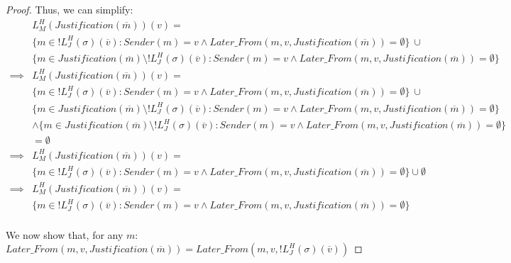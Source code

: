 \begin{proof}
Thus, we can simplify:
\begin{align}
          &L^H_M(Justification(\overline{m}))(v) = \\
          &\{m \in !L^H_J(\sigma)(\overline{v}) : Sender(m) = v \land Later\_From(m,v,Justification(\overline{m})) = \emptyset\} ~\cup \\
          &\{m \in Justification(\overline{m}) \setminus !L^H_J(\sigma)(\overline{v}) : Sender(m) = v \land Later\_From(m,v,Justification(\overline{m})) = \emptyset\}\\
  \implies&L^H_M(Justification(\overline{m}))(v) = \\
          &\{m \in !L^H_J(\sigma)(\overline{v}) : Sender(m) = v \land Later\_From(m,v,Justification(\overline{m})) = \emptyset\} ~\cup \\
          &\{m \in Justification(\overline{m}) \setminus !L^H_J(\sigma)(\overline{v}) : Sender(m) = v \land Later\_From(m,v,Justification(\overline{m})) = \emptyset\}\\
          &\land \{m \in Justification(\overline{m}) \setminus !L^H_J(\sigma)(\overline{v}) : Sender(m) = v \land Later\_From(m,v,Justification(\overline{m})) = \emptyset\} \\
          &= \emptyset \\
  \implies&L^H_M(Justification(\overline{m}))(v) = \\
          &\{m \in !L^H_J(\sigma)(\overline{v}) : Sender(m) = v \land Later\_From(m,v,Justification(\overline{m})) = \emptyset\} \cup \emptyset \\
  \implies&L^H_M(Justification(\overline{m}))(v) = \\
          &\{m \in !L^H_J(\sigma)(\overline{v}) : Sender(m) = v \land Later\_From(m,v,Justification(\overline{m})) = \emptyset\} \\
\end{align}

We now show that, for any $m$:
$Later\_From(m,v,Justification(\overline{m})) = Later\_From(m,v,!L^H_J(\sigma)(\overline{v}))$


\end{proof}
